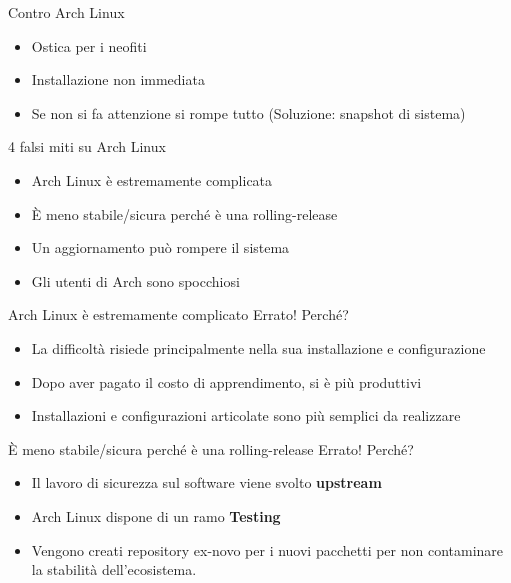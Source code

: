 
\begin{frame}{Contro Arch Linux}
    \begin{itemize}
        \item Ostica per i neofiti
        \item Installazione non immediata
        \item Se non si fa attenzione si rompe tutto (Soluzione: snapshot di sistema)
    \end{itemize}
\end{frame}


\begin{frame}{4 falsi miti su Arch Linux}
    \begin{itemize}
        \item Arch Linux è estremamente complicata
        \item È meno stabile/sicura perché è una rolling-release
        \item Un aggiornamento può rompere il sistema
        \item Gli utenti di Arch sono spocchiosi
    \end{itemize}
\end{frame}


\begin{frame}{Arch Linux è estremamente complicato}
    \alert{Errato!} Perché?
    \begin{itemize}
        \item La difficoltà risiede principalmente nella sua installazione e configurazione
        \item Dopo aver pagato il costo di apprendimento, si è più produttivi
        \item Installazioni e configurazioni articolate sono più semplici da realizzare
        
    \end{itemize}
\end{frame}


\begin{frame}{È meno stabile/sicura perché è una rolling-release}
    \alert{Errato!} Perché?
    \begin{itemize}
        \item Il lavoro di sicurezza sul software viene svolto \textbf{upstream}
        \item Arch Linux dispone di un ramo \textbf{Testing}
        \item Vengono creati repository ex-novo per i nuovi pacchetti per non contaminare la stabilità dell'ecosistema.
    \end{itemize}
\end{frame}

